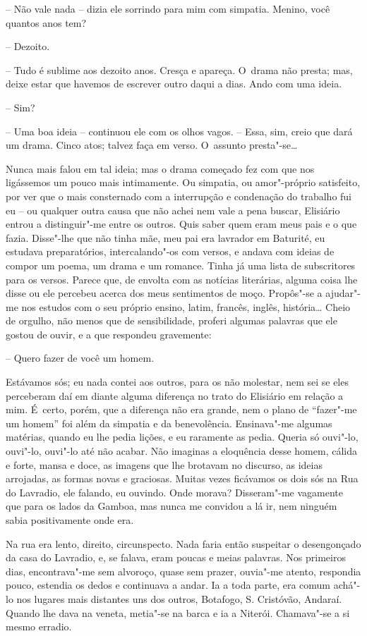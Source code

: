 -- Não vale nada -- dizia ele sorrindo para mim com simpatia. Menino,
você quantos anos tem?

-- Dezoito.

-- Tudo é sublime aos dezoito anos. Cresça e apareça. O~drama não
presta; mas, deixe estar que havemos de escrever outro daqui a dias.
Ando com uma ideia.

-- Sim?

-- Uma boa ideia -- continuou ele com os olhos vagos. -- Essa, sim,
creio que dará um drama. Cinco atos; talvez faça em verso. O~assunto
presta"-se\ldots{}

Nunca mais falou em tal ideia; mas o drama começado fez com que nos
ligássemos um pouco mais intimamente. Ou simpatia, ou amor"-próprio
satisfeito, por ver que o mais consternado com a interrupção e
condenação do trabalho fui eu -- ou qualquer outra causa que não achei
nem vale a pena buscar, Elisiário entrou a distinguir"-me entre os
outros. Quis saber quem eram meus pais e o que fazia. Disse"-lhe que não
tinha mãe, meu pai era lavrador em Baturité, eu estudava preparatórios,
intercalando"-os com versos, e andava com ideias de compor um poema, um
drama e um romance. Tinha já uma lista de subscritores para os versos.
Parece que, de envolta com as notícias literárias, alguma coisa lhe
disse ou ele percebeu acerca dos meus sentimentos de moço. Propôs"-se a
ajudar"-me nos estudos com o seu próprio ensino, latim, francês, inglês,
história\ldots{} Cheio de orgulho, não menos que de sensibilidade, proferi
algumas palavras que ele gostou de ouvir, e a que respondeu gravemente:

-- Quero fazer de você um homem.

Estávamos sós; eu nada contei aos outros, para os não molestar, nem sei
se eles perceberam daí em diante alguma diferença no trato do Elisiário
em relação a mim. É~certo, porém, que a diferença não era grande, nem o
plano de ``fazer"-me um homem'' foi além da simpatia e da benevolência.
Ensinava"-me algumas matérias, quando eu lhe pedia lições, e eu raramente
as pedia. Queria só ouvi"-lo, ouvi"-lo, ouvi"-lo até não acabar. Não
imaginas a eloquência desse homem, cálida e forte, mansa e doce, as
imagens que lhe brotavam no discurso, as ideias arrojadas, as formas
novas e graciosas. Muitas vezes ficávamos os dois sós na Rua do
Lavradio, ele falando, eu ouvindo. Onde morava? Disseram"-me vagamente
que para os lados da Gamboa, mas nunca me convidou a lá ir, nem ninguém
sabia positivamente onde era.

Na rua era lento, direito, circunspecto. Nada faria então suspeitar o
desengonçado da casa do Lavradio, e, se falava, eram poucas e meias
palavras. Nos primeiros dias, encontrava"-me sem alvoroço, quase sem
prazer, ouvia"-me atento, respondia pouco, estendia os dedos e continuava
a andar. Ia a toda parte, era comum achá"-lo nos lugares mais distantes
uns dos outros, Botafogo, S. Cristóvão, Andaraí. Quando lhe dava na
veneta, metia"-se na barca e ia a Niterói. Chamava"-se a si mesmo erradio.

